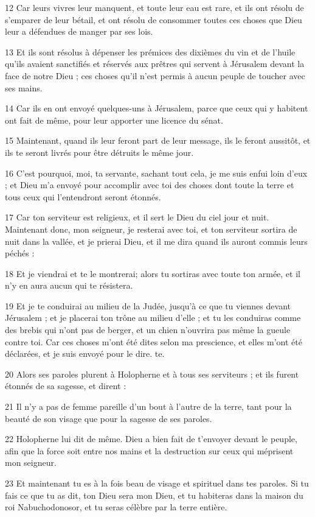 \par 12 Car leurs vivres leur manquent, et toute leur eau est rare, et ils ont résolu de s'emparer de leur bétail, et ont résolu de consommer toutes ces choses que Dieu leur a défendues de manger par ses lois.
\par 13 Et ils sont résolus à dépenser les prémices des dixièmes du vin et de l'huile qu'ils avaient sanctifiés et réservés aux prêtres qui servent à Jérusalem devant la face de notre Dieu ; ces choses qu'il n'est permis à aucun peuple de toucher avec ses mains.
\par 14 Car ils en ont envoyé quelques-uns à Jérusalem, parce que ceux qui y habitent ont fait de même, pour leur apporter une licence du sénat.
\par 15 Maintenant, quand ils leur feront part de leur message, ils le feront aussitôt, et ils te seront livrés pour être détruits le même jour.
\par 16 C'est pourquoi, moi, ta servante, sachant tout cela, je me suis enfui loin d'eux ; et Dieu m'a envoyé pour accomplir avec toi des choses dont toute la terre et tous ceux qui l'entendront seront étonnés.
\par 17 Car ton serviteur est religieux, et il sert le Dieu du ciel jour et nuit. Maintenant donc, mon seigneur, je resterai avec toi, et ton serviteur sortira de nuit dans la vallée, et je prierai Dieu, et il me dira quand ils auront commis leurs péchés :
\par 18 Et je viendrai et te le montrerai; alors tu sortiras avec toute ton armée, et il n'y en aura aucun qui te résistera.
\par 19 Et je te conduirai au milieu de la Judée, jusqu'à ce que tu viennes devant Jérusalem ; et je placerai ton trône au milieu d'elle ; et tu les conduiras comme des brebis qui n'ont pas de berger, et un chien n'ouvrira pas même la gueule contre toi. Car ces choses m'ont été dites selon ma prescience, et elles m'ont été déclarées, et je suis envoyé pour le dire. te.
\par 20 Alors ses paroles plurent à Holopherne et à tous ses serviteurs ; et ils furent étonnés de sa sagesse, et dirent :
\par 21 Il n'y a pas de femme pareille d'un bout à l'autre de la terre, tant pour la beauté de son visage que pour la sagesse de ses paroles.
\par 22 Holopherne lui dit de même. Dieu a bien fait de t'envoyer devant le peuple, afin que la force soit entre nos mains et la destruction sur ceux qui méprisent mon seigneur.
\par 23 Et maintenant tu es à la fois beau de visage et spirituel dans tes paroles. Si tu fais ce que tu as dit, ton Dieu sera mon Dieu, et tu habiteras dans la maison du roi Nabuchodonosor, et tu seras célèbre par la terre entière.

